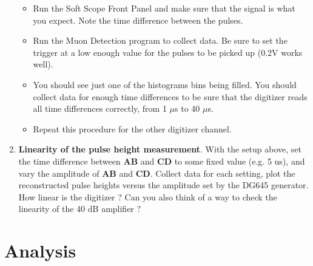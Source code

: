 \documentclass{../lab}
\begin{document}
\begin{enumerate}
\begin{itemize}
        \item Run the Soft Scope Front Panel and make sure that the signal is what you expect. Note the time difference between the pulses.

        \item Run the Muon Detection program to collect data. Be sure to set the trigger at a low enough value for the pulses to be picked up (0.2V works well).

        \item You should see just one of the histograms bins being filled. You should collect data for enough time differences to be sure that the digitizer reads all time differences correctly, from 1 $\mu$s to 40 $\mu$s.

        \item Repeat this procedure for the other digitizer channel.

    \end{itemize}

    \item \textbf{Linearity of the pulse height measurement}. With the setup above, set the time difference between \textbf{AB} and \textbf{CD} to some fixed value (e.g. 5 us), and vary the amplitude of \textbf{AB} and \textbf{CD}. Collect data for each setting, plot the reconstructed pulse heights versus the amplitude set by the DG645 generator. How linear is the digitizer ? Can you also think of a way to check the linearity of the 40 dB amplifier ?

\end{enumerate}

\section{Analysis}
\end{document}
